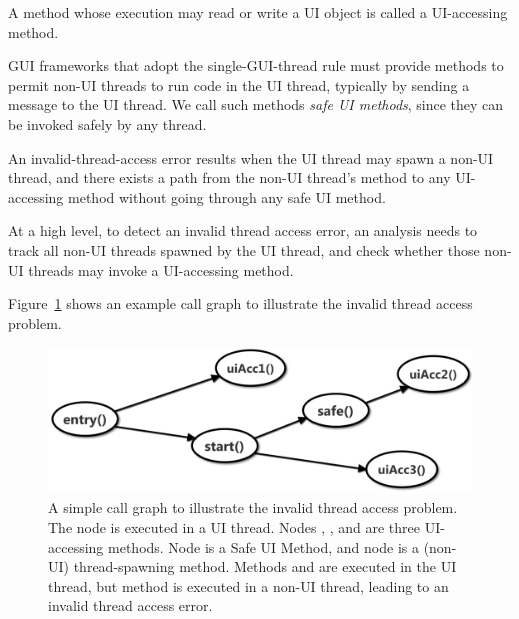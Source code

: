  { A method
whose execution may read or write a UI object is called a UI-accessing method.}\vspace{1mm}

 {GUI frameworks that
adopt the single-GUI-thread rule must provide methods to permit non-UI threads
to run code in the UI thread, typically by sending a message to the UI thread.
We call such methods \textit{safe UI methods}, since
they can be invoked safely by any thread.}\vspace{1mm}

 {An invalid-thread-access error results when the UI thread may spawn a non-UI thread, and there
exists a path from the non-UI thread's  method to any UI-accessing method
without going through any safe UI method. }\vspace{1mm}


At a high level, to detect an invalid thread access error, an analysis needs to track all
non-UI threads spawned by the UI thread, and check whether those non-UI threads
may invoke a UI-accessing method.\vspace{1mm}


 Figure~\ref{fig:simplecg} shows an example call graph
to illustrate the invalid thread access problem.


\begin{figure}[t]
  \centering
  \includegraphics[scale=0.40]{simplecg}
  \vspace*{-1.0ex}\caption {{\label{fig:simplecg} A simple call graph to illustrate the
invalid thread access problem. The  node is executed
in a UI thread. Nodes , , and  are
three UI-accessing methods. Node  is a Safe UI Method, and
node  is a (non-UI) thread-spawning method. Methods 
and  are executed in the UI thread, but method 
is executed in a non-UI thread, leading to an invalid thread access error.}}
\vspace{-2mm}
\end{figure}


